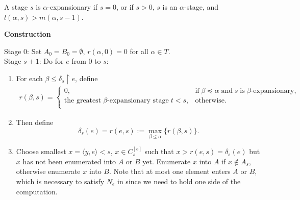   \begin{definition}
    A stage $s$ is $\alpha$-expansionary if $s=0$, or if $s>0$, $s$ is an
    $\alpha$-stage, and $l(\alpha,s)>m(\alpha,s-1)$.
  \end{definition}

  \textbf{Construction}
  \begin{tcolorbox}
    Stage 0: Set $A_0=B_0=\emptyset$, $r(\alpha,0)=0$ for all $\alpha\in
    T$. \\

    Stage $s+1$: Do for $e$ from 0 to $s$:
    \begin{enumerate}
      \item For each $\beta\leq \delta_s\restriction e$, define
        \begin{align*}
          r(\beta,s) =
          \begin{cases}
            0, &\text{if}\; \beta\preceq\alpha\; \text{and}\; s\;
              \text{is}\; \beta\text{-expansionary},\\
            \text{the greatest}\; \beta\text{-expansionary stage}\; t<s,
              &\text{otherwise}.\\
          \end{cases}
        \end{align*}
      \item Then define
        \[\delta_s(e) =r(e,s) :=\max_{\beta\leq\alpha}\{r(\beta,s)\}.\]
      \item Choose smallest $x=\langle y,e\rangle<s$, $x\in C_s^{[e]}$ such
        that $x>r(e,s)=\delta_s(e)$ but $x$ has not been enumerated into
        $A$ or $B$ yet. Enumerate $x$ into $A$ if $x\not\in A_s$, otherwise
        enumerate $x$ into $B$. Note that at most one element enters $A$ or
        $B$, which is necessary to satisfy $N_e$ in since we need to hold
        one side of the computation.
    \end{enumerate}
  \end{tcolorbox}

